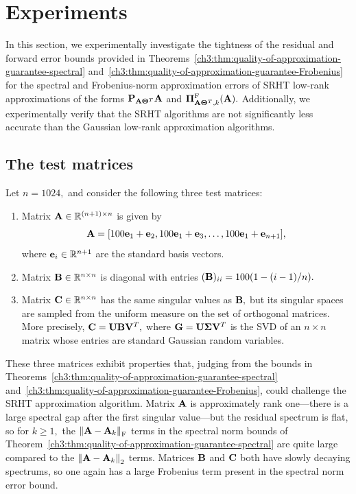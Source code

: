 \section{Experiments}\label{ch3:sec:experiments}

In this section, we experimentally investigate the tightness of the residual 
and forward error bounds provided in 
Theorems~\ref{ch3:thm:quality-of-approximation-guarantee-spectral} 
and~\ref{ch3:thm:quality-of-approximation-guarantee-Frobenius} for the spectral and 
Frobenius-norm approximation errors of SRHT low-rank approximations of the 
forms $\mathbf{P}_{\mathbf{A} \mathbf{\Theta}^T} \mathbf{A}$ and $\boldsymbol{\Pi}_{\mathbf{A}\mathbf{\Theta}^T, k}^{\mathrm{F}}(\mathbf{A}).$ 
Additionally, we experimentally verify that the SRHT algorithms are not 
significantly less accurate than the Gaussian low-rank approximation
algorithms.

\subsection{The test matrices}
Let $n = 1024,$  and consider the following three test matrices:
\begin{enumerate}[1.]
 \item Matrix $\mathbf{A} \in \mathbb{R}^{(n+1) \times n}$ is given by
\[ \mathbf{A} = [100 \mathbf{e}_1 + \mathbf{e}_2, 100 \mathbf{e}_1
 + \mathbf{e}_3, \ldots, 100 \mathbf{e}_1 + \mathbf{e}_{n+1}], \]
where $\mathbf{e}_i \in \mathbb{R}^{n+1}$ are the standard basis vectors.
\item Matrix $\mathbf{B} \in \mathbb{R}^{n \times n}$ is diagonal with
 entries $(\mathbf{B})_{ii} = 100(1 - (i-1)/n).$
 \item Matrix $\mathbf{C} \in \mathbb{R}^{n \times n}$ has the same singular values
   as $\mathbf{B},$ but its singular spaces are sampled from the uniform
   measure on the set of orthogonal matrices. More precisely, $\mathbf{C} =
   \mathbf{U} \mathbf{B} \mathbf{V}^T,$ where $\mathbf{G} = \mathbf{U} \mathbf{\Sigma}
   \mathbf{V}^T $ is the SVD of an $n \times n$ matrix whose entries
   are standard Gaussian random variables.
\end{enumerate}

These three matrices exhibit properties that, judging from the bounds in 
Theorems~\ref{ch3:thm:quality-of-approximation-guarantee-spectral} 
and~\ref{ch3:thm:quality-of-approximation-guarantee-Frobenius}, could challenge the
SRHT approximation algorithm. Matrix $\mathbf{A}$ is approximately rank
one---there is a large spectral gap after the first singular
value---but the residual spectrum is flat, so for $k \geq 1,$ the
$\left\|\mathbf{A}- \mathbf{A}_k\right\|_\mathrm{F}$ terms in the spectral norm bounds of
Theorem~\ref{ch3:thm:quality-of-approximation-guarantee-spectral} are quite
large compared to the $\left\|\mathbf{A}- \mathbf{A}_k\right\|_2$ terms. Matrices $\mathbf{B}$ and 
$\mathbf{C}$ both have slowly decaying
spectrums, so one again has a large Frobenius term present in the
spectral norm error bound.

